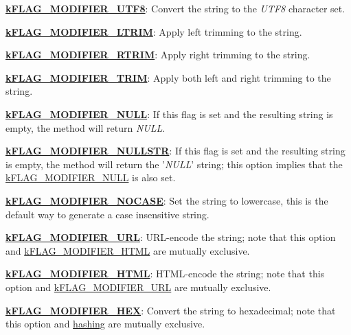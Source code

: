 \begin{DoxyItemize}
\item {\bfseries \hyperlink{}{k\-F\-L\-A\-G\-\_\-\-M\-O\-D\-I\-F\-I\-E\-R\-\_\-\-U\-T\-F8}}\-: Convert the string to the {\itshape U\-T\-F8\/} character set. 
\item {\bfseries \hyperlink{}{k\-F\-L\-A\-G\-\_\-\-M\-O\-D\-I\-F\-I\-E\-R\-\_\-\-L\-T\-R\-I\-M}}\-: Apply left trimming to the string. 
\item {\bfseries \hyperlink{}{k\-F\-L\-A\-G\-\_\-\-M\-O\-D\-I\-F\-I\-E\-R\-\_\-\-R\-T\-R\-I\-M}}\-: Apply right trimming to the string. 
\item {\bfseries \hyperlink{}{k\-F\-L\-A\-G\-\_\-\-M\-O\-D\-I\-F\-I\-E\-R\-\_\-\-T\-R\-I\-M}}\-: Apply both left and right trimming to the string. 
\item {\bfseries \hyperlink{}{k\-F\-L\-A\-G\-\_\-\-M\-O\-D\-I\-F\-I\-E\-R\-\_\-\-N\-U\-L\-L}}\-: If this flag is set and the resulting string is empty, the method will return {\itshape N\-U\-L\-L\/}. 
\begin{DoxyItemize}
\item {\bfseries \hyperlink{}{k\-F\-L\-A\-G\-\_\-\-M\-O\-D\-I\-F\-I\-E\-R\-\_\-\-N\-U\-L\-L\-S\-T\-R}}\-: If this flag is set and the resulting string is empty, the method will return the '{\itshape N\-U\-L\-L\/}' string; this option implies that the \hyperlink{}{k\-F\-L\-A\-G\-\_\-\-M\-O\-D\-I\-F\-I\-E\-R\-\_\-\-N\-U\-L\-L} is also set. 
\end{DoxyItemize}
\item {\bfseries \hyperlink{}{k\-F\-L\-A\-G\-\_\-\-M\-O\-D\-I\-F\-I\-E\-R\-\_\-\-N\-O\-C\-A\-S\-E}}\-: Set the string to lowercase, this is the default way to generate a case insensitive string. 
\item {\bfseries \hyperlink{}{k\-F\-L\-A\-G\-\_\-\-M\-O\-D\-I\-F\-I\-E\-R\-\_\-\-U\-R\-L}}\-: U\-R\-L-\/encode the string; note that this option and \hyperlink{}{k\-F\-L\-A\-G\-\_\-\-M\-O\-D\-I\-F\-I\-E\-R\-\_\-\-H\-T\-M\-L} are mutually exclusive. 
\item {\bfseries \hyperlink{}{k\-F\-L\-A\-G\-\_\-\-M\-O\-D\-I\-F\-I\-E\-R\-\_\-\-H\-T\-M\-L}}\-: H\-T\-M\-L-\/encode the string; note that this option and \hyperlink{}{k\-F\-L\-A\-G\-\_\-\-M\-O\-D\-I\-F\-I\-E\-R\-\_\-\-U\-R\-L} are mutually exclusive. 
\item {\bfseries \hyperlink{}{k\-F\-L\-A\-G\-\_\-\-M\-O\-D\-I\-F\-I\-E\-R\-\_\-\-H\-E\-X}}\-: Convert the string to hexadecimal; note that this option and \hyperlink{}{hashing} are mutually exclusive. 

\end{DoxyItemize}
